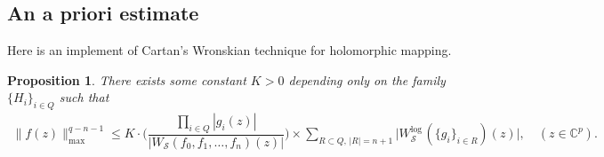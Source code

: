 \documentclass[english, 12pt]{amsart}
\def\log{\mathrm{log}\,}
\theoremstyle{plain}
\newtheorem{pro}[thm]{Proposition}
\theoremstyle{remark}
\numberwithin{equation}{section}
\theoremstyle{plain}
\theoremstyle{named}
\begin{document}
\subsection{An a priori estimate}
	
Here is an implement of Cartan's Wronskian technique for holomorphic mapping.
	
\begin{pro}
There exists some constant $K>0$ depending only on the family $\{H_i\}_{i\in Q}$ such that
		\begin{align}
		\label{estimation of norm, statement}
		\|f(z)\|_{\max}^{q-n-1}
		\leq
		K
		\cdot
		\bigg(
		\dfrac{\prod_{i\in Q}| g_i(z)|}{|W_{\mathcal{S}}(f_0,f_1,\dots,f_n)(z)|}
		\bigg)
		\times
		\sum_{R\subset Q,\,|R|=n+1}
		\big|W^{\log}_{\mathcal{S}}(\{g_i\}_{i\in R})(z)\big|,\quad (z\in\mathbb{C}^p).
		\end{align}
	\end{pro}
	
\end{document}
